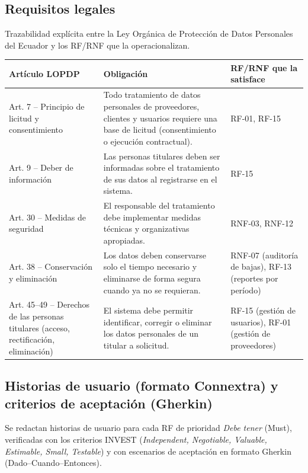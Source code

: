 \documentclass[11pt,a4paper]{article}
\begin{document}
\subsection{Requisitos legales}
Trazabilidad explícita entre la Ley Orgánica de Protección de Datos Personales del Ecuador \cite{lopd2021} y los RF/RNF que la operacionalizan.

\begin{longtable}{|p{2.5cm}|p{6cm}|p{5cm}|}
\hline
\textbf{Artículo LOPDP} & \textbf{Obligación} & \textbf{RF/RNF que la satisface} \\
\hline
Art. 7 -- Principio de licitud y consentimiento & Todo tratamiento de datos personales de proveedores, clientes y usuarios requiere una base de licitud (consentimiento o ejecución contractual). & RF-01, RF-15 \\
\hline
Art. 9 -- Deber de información & Las personas titulares deben ser informadas sobre el tratamiento de sus datos al registrarse en el sistema. & RF-15 \\
\hline
Art. 30 -- Medidas de seguridad & El responsable del tratamiento debe implementar medidas técnicas y organizativas apropiadas. & RNF-03, RNF-12 \\
\hline
Art. 38 -- Conservación y eliminación & Los datos deben conservarse solo el tiempo necesario y eliminarse de forma segura cuando ya no se requieran. & RNF-07 (auditoría de bajas), RF-13 (reportes por período) \\
\hline
Art. 45--49 -- Derechos de las personas titulares (acceso, rectificación, eliminación) & El sistema debe permitir identificar, corregir o eliminar los datos personales de un titular a solicitud. & RF-15 (gestión de usuarios), RF-01 (gestión de proveedores) \\
\hline
\end{longtable}

\subsection{Historias de usuario (formato Connextra) y criterios de aceptación (Gherkin)}
Se redactan historias de usuario para cada RF de prioridad \textit{Debe tener} (Must), verificadas con los criterios INVEST (\textit{Independent, Negotiable, Valuable, Estimable, Small, Testable}) \cite{swebok2024} y con escenarios de aceptación en formato Gherkin (Dado--Cuando--Entonces).

\newcommand{\huitem}[4]{%
\noindent\textbf{#1} (trazada a #2)\\
\textit{Como} #3\\[0.15cm]
\textbf{Criterio de aceptación (Gherkin):}\\
#4
\vspace{0.3cm}
}
\end{document}
